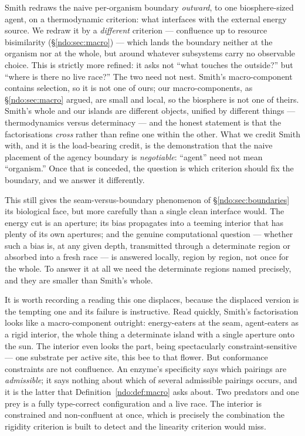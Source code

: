 \begin{remark}\label{ndo:rmk:refine}
Smith redraws the naive per-organism boundary \emph{outward}, to one biosphere-sized
agent, on a thermodynamic criterion: what interfaces with the external energy source.
We redraw it by a \emph{different} criterion --- confluence up to resource bisimilarity
(\S\ref{ndo:sec:macro}) --- which lands the boundary neither at the organism nor at the
whole, but around whatever subsystems carry no observable choice. This is strictly more
refined: it asks not ``what touches the outside?'' but ``where is there no live race?''
The two need not nest. Smith's macro-component contains selection, so it is not one of
ours; our macro-components, as \S\ref{ndo:sec:macro} argued, are small and local, so the
biosphere is not one of theirs. Smith's whole and our islands are different objects,
unified by different things --- thermodynamics versus determinacy --- and the honest
statement is that the factorisations \emph{cross} rather than refine one within the
other. What we credit Smith with, and it is the load-bearing credit, is the
demonstration that the naive placement of the agency boundary is \emph{negotiable}:
``agent'' need not mean ``organism.'' Once that is conceded, the question is which
criterion should fix the boundary, and we answer it differently.
\end{remark}

\noindent
This still gives the seam-versus-boundary phenomenon of \S\ref{ndo:sec:boundaries} its
biological face, but more carefully than a single clean interface would. The energy cut
is an aperture; its bias propagates into a teeming interior that has plenty of its own
apertures; and the genuine computational question --- whether such a bias is, at any
given depth, transmitted through a determinate region or absorbed into a fresh race ---
is answered locally, region by region, not once for the whole. To answer it at all we
need the determinate regions named precisely, and they are smaller than Smith's whole.


\begin{remark}\label{ndo:rmk:earlier}
It is worth recording a reading this one displaces, because the displaced version is
the tempting one and its failure is instructive. Read quickly, Smith's factorisation
looks like a macro-component outright: energy-eaters at the seam, agent-eaters as a
rigid interior, the whole thing a determinate island with a single aperture onto the
sun. The interior even looks the part, being spectacularly constraint-sensitive ---
one substrate per active site, this bee to that flower. But conformance constraints
are not confluence. An enzyme's specificity says which pairings are \emph{admissible};
it says nothing about which of several admissible pairings occurs, and it is the latter
that Definition~\ref{ndo:def:macro} asks about. Two predators and one prey is a fully
type-correct configuration and a live race. The interior is constrained and
non-confluent at once, which is precisely the combination the rigidity criterion is
built to detect and the linearity criterion would miss.
\end{remark}

